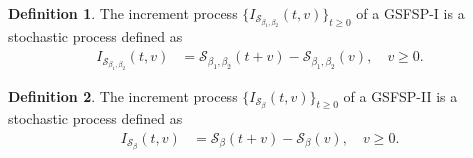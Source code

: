 \documentclass[11pt,oneside,reqno]{amsart}
\theoremstyle{definition}
\newtheorem{remark}{\bf Remark}[section]
\newtheorem{proposition}{Proposition}[section]
\newtheorem{definition}{Definition}[section]
\theoremstyle{remarkstyle}
\begin{document}



\begin{definition}
 The increment process $\{I_{\mathcal{S}_{\beta_1,\beta_2}}(t,v)\}_{t\ge 0}$ of a GSFSP-I is a stochastic process defined as
\begin{align*}
I_{\mathcal{S}_{\beta_1,\beta_2}}(t,v)&=\mathcal{S}_{\beta_1,\beta_2}(t+v)-\mathcal{S}_{\beta_1,\beta_2}(v),\quad v\ge 0.
\end{align*}
\end{definition}
\begin{definition}
 The increment process $\{I_{\mathcal{S}_{\beta}}(t,v)\}_{t\ge 0}$ of a GSFSP-II is a stochastic process defined as
\begin{align*}
I_{\mathcal{S}_{\beta}}(t,v)&=\mathcal{S}_{\beta}(t+v)-\mathcal{S}_{\beta}(v),\quad v\ge 0.
\end{align*}
\end{definition}
\end{document}
